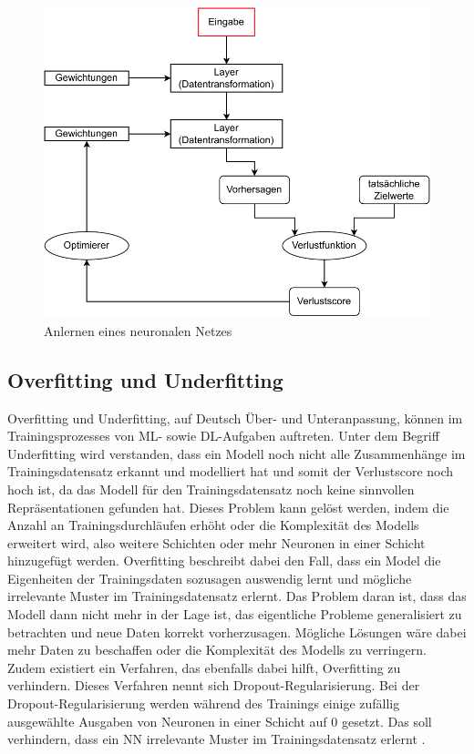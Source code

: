 \begin{figure}[H]
    \centering
    \includegraphics[width=\textwidth]{abbildungen/NN_anlernen.pdf}
    \caption{Anlernen eines neuronalen Netzes \cite[S.31]{DL_PY}}
    \label{fig:AnlernenNN}
\end{figure}

\subsection{Overfitting und Underfitting}
Overfitting und Underfitting, auf Deutsch Über- und Unteranpassung, können im Trainingsprozesses von \ac{ML}- sowie \ac{DL}-Aufgaben auftreten.
Unter dem Begriff Underfitting wird verstanden, dass ein Modell noch nicht alle Zusammenhänge im Trainingsdatensatz erkannt und modelliert hat und somit der Verlustscore noch hoch ist, 
da das Modell für den Trainingsdatensatz noch keine sinnvollen Repräsentationen gefunden hat. Dieses Problem kann gelöst werden, indem die Anzahl an Trainingsdurchläufen erhöht oder 
die Komplexität des Modells erweitert wird, also weitere Schichten oder mehr Neuronen in einer Schicht hinzugefügt werden. Overfitting beschreibt dabei den Fall,
dass ein Model die Eigenheiten der Trainingsdaten sozusagen auswendig lernt und mögliche irrelevante Muster im Trainingsdatensatz erlernt. Das Problem daran ist, dass das Modell 
dann nicht mehr in der Lage ist, das eigentliche Probleme generalisiert zu betrachten und neue Daten korrekt vorherzusagen. Mögliche Lösungen wäre dabei mehr Daten zu beschaffen
oder die Komplexität des Modells zu verringern. Zudem existiert ein Verfahren, das ebenfalls dabei hilft, Overfitting zu verhindern. Dieses Verfahren nennt sich 
Dropout-Regularisierung. Bei der Dropout-Regularisierung werden während des Trainings einige zufällig ausgewählte Ausgaben von Neuronen in einer Schicht auf 0 gesetzt. Das soll verhindern,
dass ein \ac{NN} irrelevante Muster im Trainingsdatensatz erlernt \cite[vgl. S.142ff.]{DL_PY}. 

